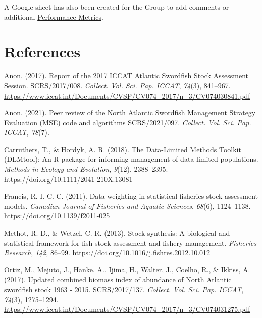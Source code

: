 \documentclass[
]{article}
\newlength{\cslhangindent}
\newlength{\cslentryspacingunit} %
\newenvironment{CSLReferences}[2] %
 {%
  \setlength{\parindent}{0pt}
  \ifodd #1
  \let\oldpar\par
  \def\par{\hangindent=\cslhangindent\oldpar}
  \fi
  \setlength{\parskip}{#2\cslentryspacingunit}
 }%
 {}
\begin{document}
A Google sheet has also been created for the Group to add comments or additional \href{https://docs.google.com/spreadsheets/d/1NytREnFCZ6OPrhXT5E5Wi8Y22w-ZmENY8kEZqDH_FQE/edit?usp=sharing}{Performance Metrics}.

\hypertarget{references}{%
\section*{References}\label{references}}

\hypertarget{refs}{}
\begin{CSLReferences}{1}{0}
\leavevmode{}%
Anon. (2017). Report of the 2017 ICCAT Atlantic Swordfish Stock Assessment Session. SCRS/2017/008. \emph{Collect. Vol. Sci. Pap. ICCAT}, \emph{74}(3), 841--967. \url{https://www.iccat.int/Documents/CVSP/CV074_2017/n_3/CV074030841.pdf}

\leavevmode{}%
Anon. (2021). Peer review of the North Atlantic Swordfish Management Strategy Evaluation (MSE) code and algorithms SCRS/2021/097. \emph{Collect. Vol. Sci. Pap. ICCAT,} \emph{78}(7).

\leavevmode{}%
Carruthers, T., \& Hordyk, A. R. (2018). The Data-Limited Methods Toolkit (DLMtool): An R package for informing management of data-limited populations. \emph{Methods in Ecology and Evolution}, \emph{9}(12), 2388--2395. \url{https://doi.org/10.1111/2041-210X.13081}

\leavevmode{}%
Francis, R. I. C. C. (2011). Data weighting in statistical fisheries stock assessment models. \emph{Canadian Journal of Fisheries and Aquatic Sciences}, \emph{68}(6), 1124--1138. \url{https://doi.org/10.1139/f2011-025}

\leavevmode{}%
Methot, R. D., \& Wetzel, C. R. (2013). Stock synthesis: A biological and statistical framework for fish stock assessment and fishery management. \emph{Fisheries Research}, \emph{142}, 86--99. \url{https://doi.org/10.1016/j.fishres.2012.10.012}

\leavevmode{}%
Ortiz, M., Mejuto, J., Hanke, A., Ijima, H., Walter, J., Coelho, R., \& Ikkiss, A. (2017). Updated combined biomass index of abundance of North Atlantic swordfish stock 1963 - 2015. SCRS/2017/137. \emph{Collect. Vol. Sci. Pap. ICCAT}, \emph{74}(3), 1275--1294. \url{https://www.iccat.int/Documents/CVSP/CV074_2017/n_3/CV074031275.pdf}

\end{CSLReferences}
\end{document}
